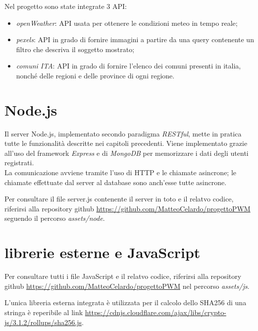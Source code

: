 Nel progetto sono state integrate 3 API:
\begin{itemize}
    \item \emph{openWeather}: API usata per ottenere le condizioni meteo in tempo reale;
    \item \emph{pexels}: API in grado di fornire immagini a partire da una query contenente un filtro che descriva il soggetto mostrato;
    \item \emph{comuni ITA}: API in grado di fornire l'elenco dei comuni presenti in italia, nonché delle regioni e delle province di ogni regione.
\end{itemize}

\section{Node.js}

Il server Node.js, implementato secondo paradigma \emph{RESTful}, mette in pratica tutte le funzionalità descritte nei capitoli precedenti. Viene implementato 
grazie all'uso del framework \emph{Express} e di \emph{MongoDB} per memorizzare i dati degli utenti registrati.\\
La comunicazione avviene tramite l'uso di HTTP e le chiamate asincrone; le chiamate effettuate dal server al database sono anch'esse tutte asincrone.

\vspace{5mm}

Per consultare il file server.js contenente il server in toto e il relatvo codice, 
riferirsi alla repository github \url{https://github.com/MatteoCelardo/progettoPWM} seguendo il percorso \emph{assets/node}.


\section{librerie esterne e JavaScript}

Per consultare tutti i file JavaScript e il relatvo codice, riferirsi alla repository github \url{https://github.com/MatteoCelardo/progettoPWM} 
nel percorso \emph{assets/js}.

L'unica libreria esterna integrata è utilizzata per il calcolo dello SHA256 di una stringa è reperibile al link \url{https://cdnjs.cloudflare.com/ajax/libs/crypto-js/3.1.2/rollups/sha256.js}.